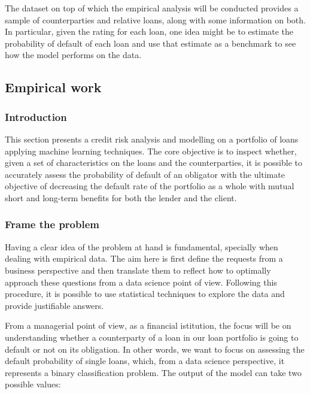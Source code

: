 \documentclass[a4paper,12pt]{article}
\begin{document}
    The dataset on top of which the empirical analysis will be conducted provides a sample of counterparties 
    and relative loans, along with some information on both. In particular, given the rating for each loan, 
    one idea might be to estimate the probability of default of each loan and use that estimate as a 
    benchmark to see how the model performs on the data.
    
    \pagebreak
    \subsection[]{Empirical work}

    \subsubsection*{Introduction}
    This section presents a credit risk analysis and modelling on a portfolio of loans 
    applying machine learning techniques. The core objective is to inspect whether, given a set of characteristics on the loans and the counterparties,
    it is possible to accurately assess the probability of default of an obligator with the ultimate objective of decreasing the default
    rate of the portfolio as a whole with mutual short and long-term benefits for both the lender and the client.
    
    \subsubsection*{Frame the problem}
    Having a clear idea of the problem at hand is fundamental, specially when dealing with 
    empirical data. The aim here is first define the requests from a business perspective and then translate them 
    to reflect how to optimally approach these questions from a data science point of view. Following this procedure, it is possible to use 
    statistical techniques to explore the data and provide justifiable answers.
    
    From a managerial point of view, as a financial istitution, the focus will be on understanding whether a counterparty
    of a loan in our loan portfolio is going to default or not on its obligation. In other words, we want to focus on assessing the default probability
    of single loans, which, from a data science perspective, it represents a binary classification problem. The output of the model can take two possible values:
    
\end{document}
